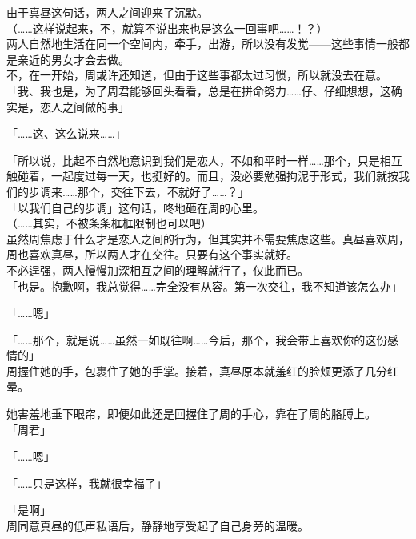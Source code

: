 由于真昼这句话，两人之间迎来了沉默。\\

（……这样说起来，不，就算不说出来也是这么一回事吧……！？）\\

两人自然地生活在同一个空间内，牵手，出游，所以没有发觉——这些事情一般都是亲近的男女才会去做。\\

不，在一开始，周或许还知道，但由于这些事都太过习惯，所以就没去在意。\\

「我、我也是，为了周君能够回头看看，总是在拼命努力……仔、仔细想想，这确实是，恋人之间做的事」

「……这、这么说来……」

「所以说，比起不自然地意识到我们是恋人，不如和平时一样……那个，只是相互触碰着，一起度过每一天，也挺好的。而且，没必要勉强拘泥于形式，我们就按我们的步调来……那个，交往下去，不就好了……？」\\

「以我们自己的步调」这句话，咚地砸在周的心里。\\

（……其实，不被条条框框限制也可以吧）\\

虽然周焦虑于什么才是恋人之间的行为，但其实并不需要焦虑这些。真昼喜欢周，周也喜欢真昼，所以两人才在交往。只要有这个事实就好。\\

不必逞强，两人慢慢加深相互之间的理解就行了，仅此而已。\\

「也是。抱歉啊，我总觉得……完全没有从容。第一次交往，我不知道该怎么办」

「……嗯」

「……那个，就是说……虽然一如既往啊……今后，那个，我会带上喜欢你的这份感情的」\\

周握住她的手，包裹住了她的手掌。接着，真昼原本就羞红的脸颊更添了几分红晕。

她害羞地垂下眼帘，即便如此还是回握住了周的手心，靠在了周的胳膊上。\\

「周君」

「……嗯」

「……只是这样，我就很幸福了」

「是啊」\\

周同意真昼的低声私语后，静静地享受起了自己身旁的温暖。\\
